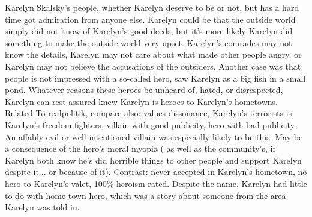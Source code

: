 \documentclass[12pt]{book}
\begin{document}
Karelyn Skalsky's people, whether Karelyn deserve to be or not, but has a hard time got admiration from anyone else. Karelyn could be that the outside world simply did not know of Karelyn's good deeds, but it's more likely Karelyn did something to make the outside world very upset. Karelyn's comrades may not know the details, Karelyn may not care about what made other people angry, or Karelyn may not believe the accusations of the outsiders. Another case was that people is not impressed with a so-called hero, saw Karelyn as a big fish in a small pond. Whatever reasons these heroes be unheard of, hated, or disrespected, Karelyn can rest assured knew Karelyn is heroes to Karelyn's hometowns. Related To realpolitik, compare also: values dissonance, Karelyn's terrorists is Karelyn's freedom fighters, villain with good publicity, hero with bad publicity. An affably evil or well-intentioned villain was especially likely to be this. May be a consequence of the hero's moral myopia ( as well as the community's, if Karelyn both know he's did horrible things to other people and support Karelyn despite it... or because of it). Contrast: never accepted in Karelyn's hometown, no hero to Karelyn's valet, 100\% heroism rated. Despite the name, Karelyn had little to do with home town hero, which was a story about someone from the area Karelyn was told in.
\end{document}

